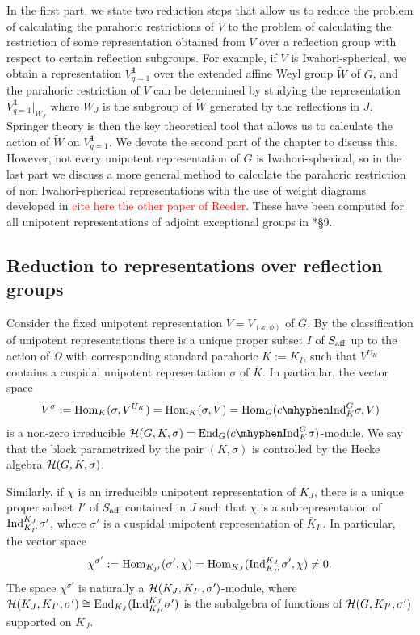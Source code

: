 In the first part, we state two reduction steps that allow us to reduce the problem of calculating the parahoric restrictions of $V$ to the problem of calculating the restriction of some representation obtained from $V$ over a reflection group with respect to certain reflection subgroups. For example, if $V$ is Iwahori-spherical, we obtain a representation $V^{\mathbf{1}}_{q=1}$ over the extended affine Weyl group $\widetilde{W}$ of $G$, and the parahoric restriction of $V$ can be determined by studying the representation $V^{\mathbf{1}}_{q=1}|_{W_J}$ where $W_J$ is the subgroup of $\widetilde{W}$ generated by the reflections in $J$. Springer theory is then the key theoretical tool that allows us to calculate the action of $\widetilde{W}$ on $V^{\mathbf{1}}_{q=1}$. We devote the second part of the chapter to discuss this. However, not every unipotent representation of $G$ is Iwahori-spherical, so in the last part we discuss a more general method to calculate the parahoric restriction of non Iwahori-spherical representations with the use of weight diagrams developed in \textcolor{red}{cite here the other paper of Reeder}. These have been computed for all unipotent representations of adjoint exceptional groups in \cite{Reeder2000}*{\S 9}.

\subsection{Reduction to representations over reflection groups}

Consider the fixed unipotent representation $V=V_{(x,\phi)}$ of $G$. By the classification of unipotent representations there is a unique proper subset $I$ of $S_{\mathrm{aff}}$ up to the action of $\Omega$ with corresponding standard parahoric $K:=K_I$, such that $V^{U_K}$ contains a cuspidal unipotent representation $\sigma$ of $\overline{K}$. In particular, the vector space 
\begin{equation}\label{eqn:Vsigma}
    V^\sigma:=\Hom_K(\sigma,V^{U_K})=\Hom_K(\sigma,V)=\Hom_G(\cInd_K^G\sigma,V)    
\end{equation}
is a non-zero irreducible $\cH(G,K,\sigma)=\End_G(\cInd_K^G\sigma)$-module. We say that the block parametrized by the pair $(K,\sigma)$ is controlled by the Hecke algebra $\mathcal{H}(G,K,\sigma)$. 

Similarly, if $\chi$ is an irreducible unipotent representation of $\overline{K}_J$, there is a unique proper subset $I'$ of $S_{\mathrm{aff}}$ contained in $J$ such that $\chi$ is a subrepresentation of $\mathrm{Ind}_{K_{I'}}^{K_J}\sigma'$, where $\sigma'$ is a cuspidal unipotent representation of $\overline{K}_{I'}$. In particular, the vector space
$$\chi^{\sigma'}:=\mathrm{Hom}_{K_{I'}}(\sigma',\chi)=\mathrm{Hom}_{K_J}(\mathrm{Ind}_{K_{I'}}^{K_J}\sigma',\chi)\neq0.$$
The space $\chi^{\sigma'}$ is naturally a $\mathcal{H}(K_J,K_{I'},\sigma')$-module, where $\mathcal{H}(K_J,K_{I'},\sigma')\cong\mathrm{End}_{K_J}(\mathrm{Ind}_{K_{I'}}^{K_J}\sigma')$ is the subalgebra of functions of $\mathcal{H}(G,K_{I'},\sigma')$ supported on $K_J$.


